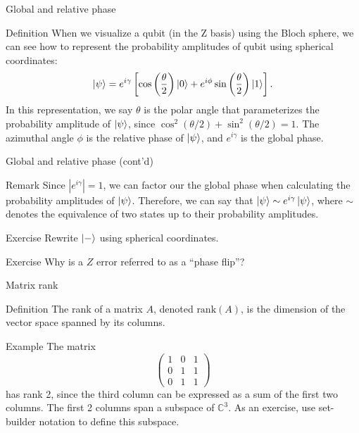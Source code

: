 \documentclass{beamer}
\newcommand{\C}{\mathbb{C}}
\newcommand{\rank}{\text{rank}}
\begin{document}
\begin{frame}{Global and relative phase}

\begin{block}{Definition}
When we visualize a qubit (in the Z basis) using the Bloch sphere, we can see how to represent the probability amplitudes of qubit using spherical coordinates:
$$ \ket\psi = e^{i\gamma} \left [ \cos\left(\frac{\theta}{2}\right) \ket 0 + e^{i\phi} \sin\left(\frac{\theta}{2}\right) \ket1 \right ]. $$
In this representation, we say $\theta$ is the polar angle that parameterizes the probability amplitude of $\ket\psi$, since $\cos^2(\theta/2) +\sin^2(\theta/2) = 1$. The azimuthal angle $\phi$ is the relative phase of $\ket\psi$, and $e^{i\gamma}$ is the global phase.
\end{block}

\end{frame}

\begin{frame}{Global and relative phase (cont'd)}

\begin{block}{Remark}
Since $\left|e^{i\gamma}\right| = 1$, we can factor our the global phase when calculating the probability amplitudes of $\ket\psi$. Therefore, we can say that $\ket\psi \sim e^{i\gamma} \ket\psi$, where $\sim$ denotes the equivalence of two states up to their probability amplitudes.
\end{block}

\begin{block}{Exercise}
Rewrite $\ket -$ using spherical coordinates.
\end{block}
\begin{block}{Exercise}
Why is a $Z$ error referred to as a ``phase flip''?
\end{block}
\end{frame}

\begin{frame}{Matrix rank}
\begin{block}{Definition}
	The rank of a matrix $A$, denoted $\rank(A)$, is the dimension of the vector space spanned by its columns.
\end{block}

\begin{block}{Example}
	The matrix $$ \begin{pmatrix} 1 & 0 & 1 \\ 0 & 1 & 1 \\ 0 & 1 & 1 \end{pmatrix} $$ has rank 2, since the third column can be expressed as a sum of the first two columns. The first 2 columns span a subspace of $\C^3$. As an exercise, use set-builder notation to define this subspace.
\end{block}

\end{frame}
\end{document}
